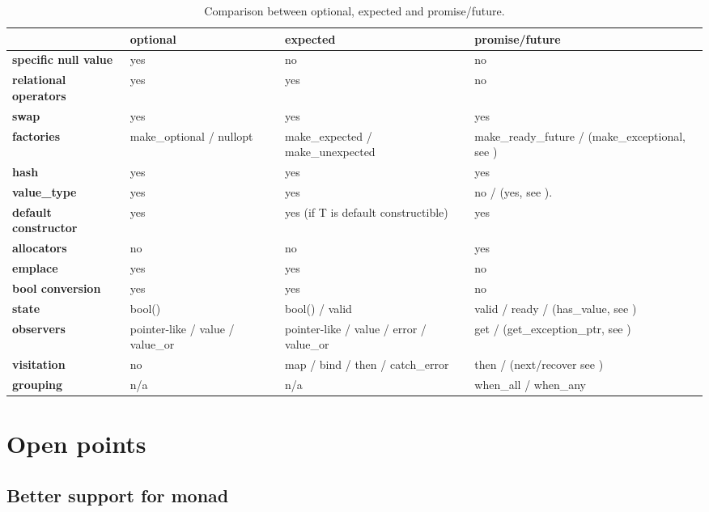 \documentclass[a4paper,10pt]{article}
\begin{document}
\begin{table}
\bgroup
\def\arraystretch{1.5}
\begin{tabular}{|l|>{\raggedright\arraybackslash}p{4cm}|>{\raggedright\arraybackslash}p{4cm}|>{\raggedright\arraybackslash}p{4cm}|}
\hline
                    & \textbf{optional} & \textbf{expected} & \textbf{promise/future} \\
\hline
\textbf{specific null value} & yes & no & no \\
\hline
\textbf{relational operators} & yes & yes & no \\
\hline
\textbf{swap} & yes & yes & yes \\
\hline
\textbf{factories} & make_optional / nullopt & make_expected / make_unexpected & make_ready_future / (make_exceptional, see \cite{MoreAsync}) \\
\hline
\textbf{hash} & yes & yes & yes \\
\hline
\textbf{value_type} & yes & yes & no / (yes, see \cite{MoreAsync}).  \\
\hline
\textbf{default constructor} & yes & yes (if T is default constructible) & yes \\
\hline
\textbf{allocators} & no & no & yes \\
\hline
\textbf{emplace} & yes & yes & no \\
\hline
\textbf{bool conversion} & yes & yes & no \\
\hline
\textbf{state} & bool()  &  bool() / valid & valid / ready / (has_value, see \cite{MoreAsync}) \\
\hline
\textbf{observers} & pointer-like / value / value_or & pointer-like / value / error / value_or & get / (get_exception_ptr, see \cite{MoreAsync}) \\
\hline
\textbf{visitation} & no & map / bind / then / catch_error  & then / (next/recover see \cite{MoreAsync}) \\
\hline
\textbf{grouping} & n/a & n/a & when_all / when_any \\
\hline
\end{tabular}
\egroup
\caption{Comparison between optional, expected and promise/future.}
\label{comp-monads}
\end{table}

\section{Open points}

\subsection{Better support for monad}
\label{better-support-for-monad}
\end{document}
